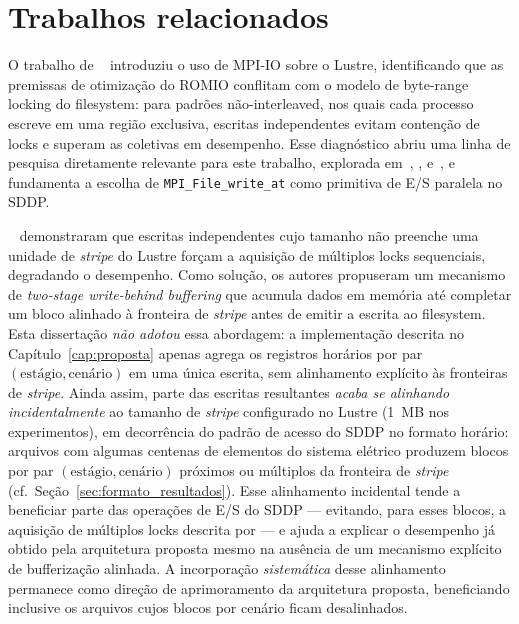 \chapter{Trabalhos relacionados}
\label{cap:trabalhos_relacionados}

O trabalho de \citeauthor{Dickens:08}~\cite{Dickens:08} introduziu o uso de MPI-IO
sobre o Lustre, identificando que as premissas de otimização do ROMIO conflitam com
o modelo de byte-range locking do filesystem: para padrões não-interleaved, nos quais
cada processo escreve em uma região exclusiva, escritas independentes evitam contenção
de locks e superam as coletivas em desempenho.
Esse diagnóstico abriu uma linha de pesquisa diretamente relevante para este trabalho,
explorada em~\cite{Dickens:10}, \cite{LiaoIPDPS:07}, \cite{Gropp:08} e~\cite{Liao:08},
e fundamenta a escolha de \texttt{MPI\_File\_write\_at} como primitiva de E/S paralela
no SDDP.

\citeauthor{LiaoIPDPS:07}~\cite{LiaoIPDPS:07} demonstraram que escritas
independentes cujo tamanho não preenche uma unidade de \textit{stripe} do
Lustre forçam a aquisição de múltiplos locks sequenciais, degradando o
desempenho. Como solução, os autores propuseram um mecanismo de
\textit{two-stage write-behind buffering} que acumula dados em memória até
completar um bloco alinhado à fronteira de \textit{stripe} antes de emitir a
escrita ao filesystem. Esta dissertação \emph{não adotou} essa abordagem: a implementação descrita no Capítulo~\ref{cap:proposta}
apenas agrega os registros horários por par
$(\text{estágio}, \text{cenário})$ em uma única escrita, sem
alinhamento explícito às fronteiras de \textit{stripe}. Ainda assim,
parte das escritas resultantes \emph{acaba se alinhando
incidentalmente} ao tamanho de \textit{stripe} configurado no Lustre
(1~MB nos experimentos), em decorrência do padrão de acesso do SDDP
no formato horário: arquivos com algumas centenas de elementos do
sistema elétrico produzem blocos por par
$(\text{estágio}, \text{cenário})$ próximos ou múltiplos da fronteira
de \textit{stripe} (cf.~Seção~\ref{sec:formato_resultados}). Esse
alinhamento incidental tende a beneficiar parte das operações de E/S
do SDDP --- evitando, para esses blocos, a aquisição de múltiplos
locks descrita por \citeauthor{LiaoIPDPS:07} --- e ajuda a explicar o
desempenho já obtido pela arquitetura proposta mesmo na ausência de
um mecanismo explícito de bufferização alinhada. A incorporação
\emph{sistemática} desse alinhamento permanece como direção de
aprimoramento da arquitetura proposta, beneficiando inclusive os arquivos
cujos blocos por cenário ficam desalinhados.

